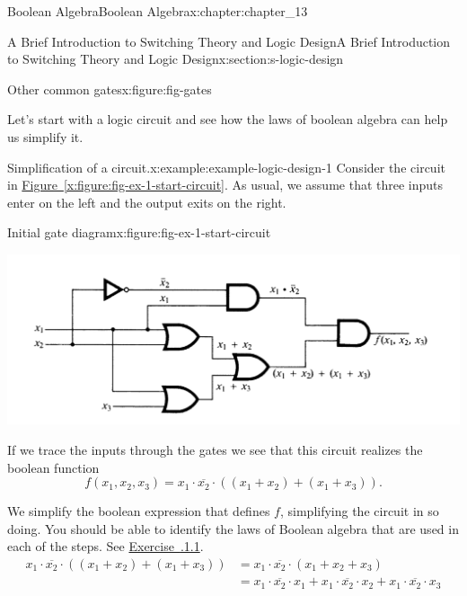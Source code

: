 \documentclass[oneside,10pt,]{book}
\newcommand{\xreffont}{\relax}
\numberwithin{equation}{section}
\begin{document}
\begin{chapterptx}{Boolean Algebra}{}{Boolean Algebra}{}{}{x:chapter:chapter_13}
\begin{sectionptx}{A Brief Introduction to Switching Theory and Logic Design}{}{A Brief Introduction to Switching Theory and Logic Design}{}{}{x:section:s-logic-design}
\begin{sidebyside}{2}{0}{0}{0}
\begin{sbspanel}{0.5}
\begin{figureptx}{Other common gates}{x:figure:fig-gates}{}
\tcblower
\end{figureptx}%
\end{sbspanel}%
\end{sidebyside}%
\par
Let's start with a logic circuit and see how the laws of boolean algebra can help us simplify it.%
\begin{example}{Simplification of a circuit.}{x:example:example-logic-design-1}%
Consider the  circuit in \hyperref[x:figure:fig-ex-1-start-circuit]{Figure~{\xreffont\ref{x:figure:fig-ex-1-start-circuit}}}. As usual, we assume that three inputs enter on the left and the output exits on the right.%
\begin{figureptx}{Initial gate diagram}{x:figure:fig-ex-1-start-circuit}{}%
\begin{image}{0.1}{0.8}{0.1}%
\includegraphics[width=\linewidth]{images/fig-ex-1-start-circuit.png}
\end{image}%
\tcblower
\end{figureptx}%
If we trace the inputs through the gates we see that this circuit realizes the boolean function%
\begin{equation*}
f\left(x_1, x_2, x_3 \right)=x_1 \cdot  \overline{x_2}\cdot \left(\left( x_1 + x_2\right) + \left(x_1 + x_3\right)\right).
\end{equation*}
%
\par
We simplify the boolean expression that defines \(f\), simplifying the circuit in so doing.  You should be able to identify the laws of Boolean algebra that are used in each of the steps.  See \hyperlink{x:exercise:exercise-137-1}{Exercise~{\xreffont 13.7.1.1}}.%
\begin{equation*}
\begin{split}
x_1 \cdot  \overline{x_2}\cdot \left(\left( x_1 + x_2\right) + \left(x_1 + x_3\right)\right) & =
x_1 \cdot \overline{x_2}\cdot \left(x_1+ x_2 + x_3\right)\\
& = x_1 \cdot  \overline{x_2} \cdot  x_1 + x_1 \cdot \overline{x_2} \cdot x_2  + x_1 \cdot  \overline{x_2} \cdot x_3 \\

\end{split}
\end{equation*}
\end{example}
\end{sectionptx}
\end{chapterptx}
\end{document}

